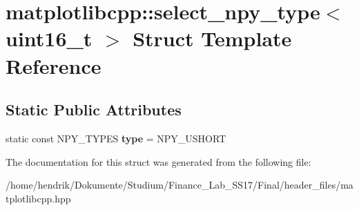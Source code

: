 \hypertarget{structmatplotlibcpp_1_1select__npy__type_3_01uint16__t_01_4}{}\section{matplotlibcpp\+:\+:select\+\_\+npy\+\_\+type$<$ uint16\+\_\+t $>$ Struct Template Reference}
\label{structmatplotlibcpp_1_1select__npy__type_3_01uint16__t_01_4}
\subsection*{Static Public Attributes}
\begin{DoxyCompactItemize}
\item 
static const N\+P\+Y\+\_\+\+T\+Y\+P\+ES {\bfseries type} = N\+P\+Y\+\_\+\+U\+S\+H\+O\+RT\hypertarget{structmatplotlibcpp_1_1select__npy__type_3_01uint16__t_01_4_aca209b33cc0bcaad16c01bff097a075f}{}\label{structmatplotlibcpp_1_1select__npy__type_3_01uint16__t_01_4_aca209b33cc0bcaad16c01bff097a075f}

\end{DoxyCompactItemize}


The documentation for this struct was generated from the following file\+:\begin{DoxyCompactItemize}
\item 
/home/hendrik/\+Dokumente/\+Studium/\+Finance\+\_\+\+Lab\+\_\+\+S\+S17/\+Final/header\+\_\+files/matplotlibcpp.\+hpp\end{DoxyCompactItemize}
